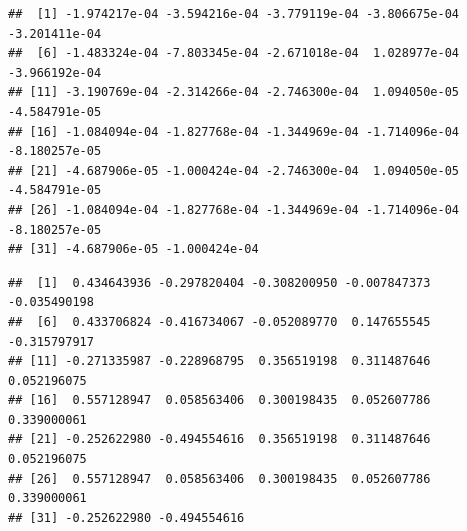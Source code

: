 \documentclass[
]{krantz}
\makeatletter
\newenvironment{Shaded}{\begin{snugshade}}{\end{snugshade}}
\newcommand{\CommentTok}[1]{\textcolor[rgb]{0.56,0.35,0.01}{\textit{#1}}}
\newcommand{\DataTypeTok}[1]{\textcolor[rgb]{0.13,0.29,0.53}{#1}}
\newcommand{\DecValTok}[1]{\textcolor[rgb]{0.00,0.00,0.81}{#1}}
\newcommand{\FloatTok}[1]{\textcolor[rgb]{0.00,0.00,0.81}{#1}}
\newcommand{\KeywordTok}[1]{\textcolor[rgb]{0.13,0.29,0.53}{\textbf{#1}}}
\newcommand{\NormalTok}[1]{#1}
\newcommand{\OperatorTok}[1]{\textcolor[rgb]{0.81,0.36,0.00}{\textbf{#1}}}
\newcommand{\StringTok}[1]{\textcolor[rgb]{0.31,0.60,0.02}{#1}}
\newenvironment{kframe}{%
\medskip{}
\setlength{\fboxsep}{.8em}
 \def\at@end@of@kframe{}%
 \ifinner\ifhmode%
  \def\at@end@of@kframe{\end{minipage}}%
  \begin{minipage}{\columnwidth}%
 \fi\fi%
 \def\FrameCommand##1{\hskip\@totalleftmargin \hskip-\fboxsep
 \colorbox{shadecolor}{##1}\hskip-\fboxsep
     \hskip-\linewidth \hskip-\@totalleftmargin \hskip\columnwidth}%
 \MakeFramed {\advance\hsize-\width
   \@totalleftmargin\z@ \linewidth\hsize
   \@setminipage}}%
 {\par\unskip\endMakeFramed%
 \at@end@of@kframe}
\renewenvironment{Shaded}{\begin{kframe}}{\end{kframe}}
\makeatother
\begin{document}
\begin{Shaded}
\end{Shaded}

\begin{verbatim}
##  [1] -1.974217e-04 -3.594216e-04 -3.779119e-04 -3.806675e-04 -3.201411e-04
##  [6] -1.483324e-04 -7.803345e-04 -2.671018e-04  1.028977e-04 -3.966192e-04
## [11] -3.190769e-04 -2.314266e-04 -2.746300e-04  1.094050e-05 -4.584791e-05
## [16] -1.084094e-04 -1.827768e-04 -1.344969e-04 -1.714096e-04 -8.180257e-05
## [21] -4.687906e-05 -1.000424e-04 -2.746300e-04  1.094050e-05 -4.584791e-05
## [26] -1.084094e-04 -1.827768e-04 -1.344969e-04 -1.714096e-04 -8.180257e-05
## [31] -4.687906e-05 -1.000424e-04
\end{verbatim}

\begin{Shaded}
\end{Shaded}

\begin{verbatim}
##  [1]  0.434643936 -0.297820404 -0.308200950 -0.007847373 -0.035490198
##  [6]  0.433706824 -0.416734067 -0.052089770  0.147655545 -0.315797917
## [11] -0.271335987 -0.228968795  0.356519198  0.311487646  0.052196075
## [16]  0.557128947  0.058563406  0.300198435  0.052607786  0.339000061
## [21] -0.252622980 -0.494554616  0.356519198  0.311487646  0.052196075
## [26]  0.557128947  0.058563406  0.300198435  0.052607786  0.339000061
## [31] -0.252622980 -0.494554616
\end{verbatim}

\begin{Shaded}
\end{Shaded}
\end{document}
